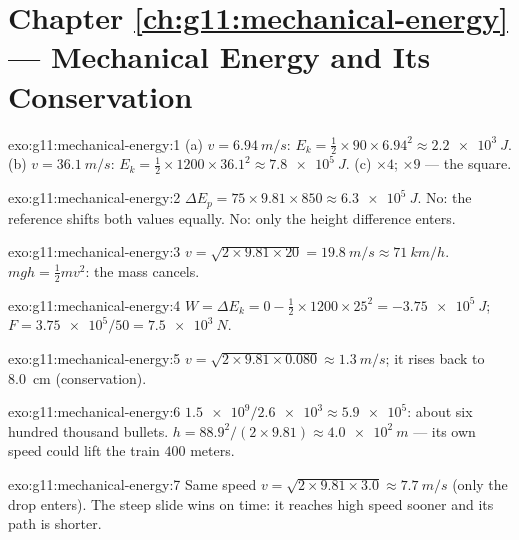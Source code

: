 \section*{Chapter \ref{ch:g11:mechanical-energy} --- Mechanical Energy and Its Conservation}

\begin{solution}{exo:g11:mechanical-energy:1}
(a) $v = \qty{6.94}{m/s}$:
$E_k = \tfrac12 \times 90 \times 6.94^2 \approx \qty{2.2e3}{J}$.
(b) $v = \qty{36.1}{m/s}$:
$E_k = \tfrac12 \times 1200 \times 36.1^2 \approx \qty{7.8e5}{J}$.
(c) $\times 4$; $\times 9$ --- the square.
\end{solution}

\begin{solution}{exo:g11:mechanical-energy:2}
$\Delta E_p = 75 \times 9.81 \times 850 \approx \qty{6.3e5}{J}$. No:
the reference shifts both values equally. No: only the height
difference enters.
\end{solution}

\begin{solution}{exo:g11:mechanical-energy:3}
$v = \sqrt{2 \times 9.81 \times 20} = \qty{19.8}{m/s} \approx
\qty{71}{km/h}$. $mgh = \tfrac12 mv^2$: the mass cancels.
\end{solution}

\begin{solution}{exo:g11:mechanical-energy:4}
$W = \Delta E_k = 0 - \tfrac12 \times 1200 \times 25^2 =
\qty{-3.75e5}{J}$; $F = \num{3.75e5}/50 = \qty{7.5e3}{N}$.
\end{solution}

\begin{solution}{exo:g11:mechanical-energy:5}
$v = \sqrt{2 \times 9.81 \times 0.080} \approx \qty{1.3}{m/s}$; it
rises back to \qty{8.0}{cm} (conservation).
\end{solution}

\begin{solution}{exo:g11:mechanical-energy:6}
$\num{1.5e9}/\num{2.6e3} \approx \num{5.9e5}$: about six hundred
thousand bullets. $h = 88.9^2/(2 \times 9.81) \approx \qty{4.0e2}{m}$
--- its own speed could lift the train $400$ meters.
\end{solution}

\begin{solution}{exo:g11:mechanical-energy:7}
Same speed $v = \sqrt{2 \times 9.81 \times 3.0} \approx \qty{7.7}{m/s}$
(only the drop enters). The steep slide wins on time: it reaches high
speed sooner and its path is shorter.
\end{solution}

